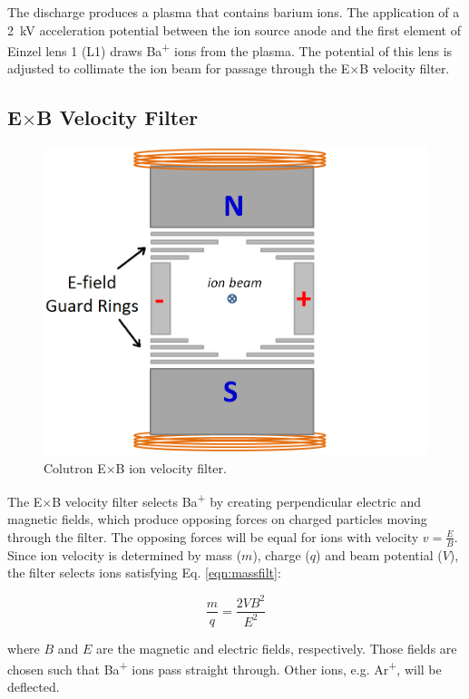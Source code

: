 The discharge produces a plasma that contains barium ions.  The application of a 2~kV acceleration potential between the ion source anode and the first element of Einzel lens 1 (L1) draws Ba\textsuperscript{+} ions from the plasma.  The potential of this lens is adjusted to collimate the ion beam for passage through the E$\times$B velocity filter.


\subsection{E$\times$B Velocity Filter}

\begin{figure} %
        \centering
                \includegraphics[width=.6\textwidth]{figures/ExB.png}
                \caption{Colutron E$\times$B ion velocity filter.}
\label{fig:exb}
\end{figure}

The E$\times$B velocity filter selects Ba\textsuperscript{+} by creating perpendicular electric and magnetic fields, which produce opposing forces on charged particles moving through the filter.  The opposing forces will be equal for ions with velocity $v = \frac{E}{B}$.  Since ion velocity is determined by mass ($m$), charge ($q$) and beam potential ($V$), the filter selects ions satisfying Eq. \ref{eqn:massfilt}:

\begin{equation}
\frac{m}{q} = \frac{2 V B^{2}}{E^{2}}
\label{eqn:massfilt}
\end{equation}

\noindent
where $B$ and $E$ are the magnetic and electric fields, respectively.  Those fields are chosen such that Ba\textsuperscript{+} ions pass straight through.  Other ions, e.g. Ar\textsuperscript{+}, will be deflected.  

